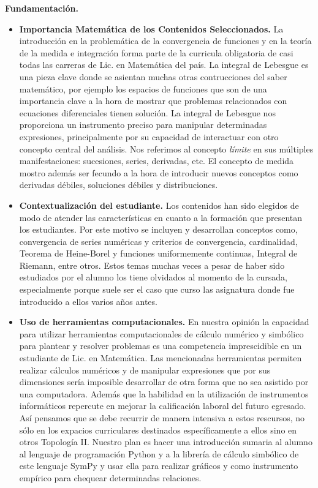 \documentclass[12pt]{article}
\begin{document}
\textbf{Fundamentación.}

\begin{itemize}
 \item \textbf{Importancia Matemática de los Contenidos Seleccionados.}  La introducción en la problemática de la convergencia de funciones y en la teoría de la medida e integración forma parte de la curricula obligatoria de casi todas las carreras de Lic. en Matemática del país. La integral de Lebesgue es una pieza clave donde se asientan  muchas otras contrucciones del saber matemático, por ejemplo los espacios de funciones que son de una importancia clave a la hora de mostrar que problemas  relacionados con ecuaciones diferenciales tienen solución. La integral de Lebesgue nos proporciona  un instrumento preciso para manipular determinadas expresiones, principalmente por su capacidad de interactuar con otro  concepto central del análisis. Nos referimos al concepto \emph{límite} en sus múltiples manifestaciones: sucesiones, series, derivadas, etc. El concepto de medida mostro además ser fecundo a la hora de introducir nuevos conceptos como derivadas débiles, soluciones débiles y distribuciones. 

\item \textbf{Contextualización del estudiante.} Los contenidos han sido elegidos de modo de atender las características en cuanto a la formación que presentan los estudiantes. Por este motivo se  incluyen y desarrollan conceptos como, convergencia de series numéricas y criterios de convergencia, cardinalidad, Teorema de Heine-Borel y funciones uniformemente continuas, Integral de Riemann, entre otros. Estos temas muchas veces a pesar de haber sido estudiados por el alumno los tiene olvidados al momento de la cursada, especialmente porque suele ser el caso que curso las asignatura donde fue introducido a ellos  varios años antes.


\item \textbf{Uso de herramientas computacionales.}  En nuestra opinión  la capacidad para utilizar  herramientas computacionales de cálculo numérico y simbólico para plantear y resolver problemas es una competencia imprescidible en un estudiante de Lic. en Matemática. Las mencionadas herramientas permiten realizar cálculos numéricos y de manipular expresiones  que  por sus dimensiones sería imposible desarrollar  de otra forma que no sea asistido por una computadora. Además que la habilidad en la utilización de instrumentos informáticos repercute en mejorar la calificación laboral del futuro egresado. Así pensamos que se debe recurrir de manera intensiva  a estos rescursos, no sólo en los expacios curriculares destinados específicamente a ellos sino en otros Topología II. Nuestro plan es hacer una  introducción sumaria  al alumno al lenguaje de programación Python y a la librería de cálculo simbólico de este lenguaje SymPy y usar ella para realizar gráficos y como instrumento empírico para chequear determinadas relaciones.


\end{itemize}
\end{document}
